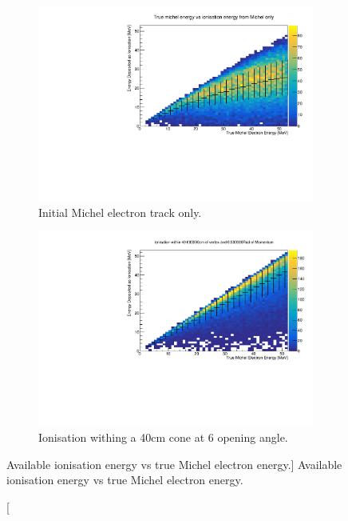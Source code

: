 \begin{figure}
	\centering

	\begin{subfigure}[b]{\textwidth}
		\includegraphics[clip, trim = 0cm 0cm 0cm 1cm, width=\textwidth]{figures/michel_track_only.pdf}
		\caption[Initial Michel electron track only.]{Initial Michel electron track only.}
		\label{fig:track_only}
	\end{subfigure}

	\vspace{5mm}

	\begin{subfigure}[b]{\textwidth}
		\includegraphics[clip, trim = 0cm 0cm 0cm 1cm, width=\textwidth]{figures/cone_reco.pdf}
		\caption[Ionisation withing a 40cm cone at 6 \degree opening angle.]{Ionisation withing a 40cm cone at 6 \degree opening angle.}
		\label{fig:cone_reco}
	\end{subfigure}

	\caption
	[Available ionisation energy vs true Michel electron energy.]
	{Available ionisation energy vs true Michel electron energy.}

	\label{fig:michel_track_only}

\end{figure}

